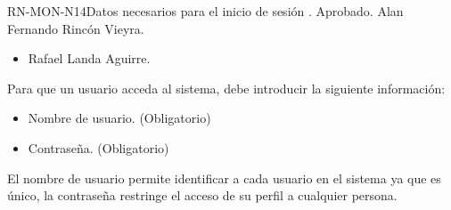 %
\begin{BusinessRule}{RN-MON-N14}{Datos necesarios para el inicio de sesión}
	{\bcIntegridad}
	{\btEnabler}
	{\blControlling}
	.
	\BRItem[Estado] Aprobado.
	 Alan Fernando Rincón Vieyra.
	 \cdtEmpty
	\begin{itemize}
		\item Rafael Landa Aguirre.
	\end{itemize}
	\BRItem[Descripción] Para que un usuario acceda al sistema, debe 
	introducir la siguiente información:
	\begin{itemize}
		\item Nombre de usuario. (Obligatorio)
		\item Contraseña. (Obligatorio)
	\end{itemize}
	\BRItem[Motivación] El nombre de usuario permite identificar a cada 
	usuario en el sistema ya que es único, la contraseña restringe el acceso 
	de su perfil a cualquier persona.
\end{BusinessRule}
